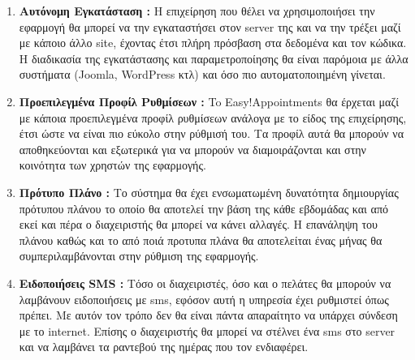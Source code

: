 \documentclass[12pt]{article}
\begin{document}
\begin{enumerate}
\item {\bf Αυτόνομη Εγκατάσταση :} Η επιχείρηση που θέλει να χρησιμοποιήσει την εφαρμογή θα μπορεί να την εγκαταστήσει στον server της και να την τρέξει μαζί με κάποιο άλλο site, έχοντας έτσι πλήρη πρόσβαση στα δεδομένα και τον κώδικα. Η διαδικασία της εγκατάστασης και παραμετροποίησης θα είναι παρόμοια με άλλα συστήματα (Joomla, WordPress κτλ) και όσο πιο αυτοματοποιημένη γίνεται.

\item {\bf Προεπιλεγμένα Προφίλ Ρυθμίσεων :} To Easy!Appointments θα έρχεται μαζί με κάποια προεπιλεγμένα προφίλ ρυθμίσεων ανάλογα με το είδος της επιχείρησης, έτσι ώστε να είναι πιο εύκολο στην ρύθμισή του. Τα προφίλ αυτά θα μπορούν να αποθηκεύονται και εξωτερικά για να μπορούν να διαμοιράζονται και στην κοινότητα των χρηστών της εφαρμογής.

\item {\bf Πρότυπο Πλάνο :} Το σύστημα θα έχει ενσωματωμένη δυνατότητα δημιουργίας πρότυπου πλάνου το οποίο θα αποτελεί την βάση της κάθε εβδομάδας και από εκεί και πέρα ο διαχειριστής θα μπορεί να κάνει αλλαγές. Η επανάληψη του πλάνου καθώς και το από ποιά προτυπα πλάνα θα αποτελείται ένας μήνας θα συμπεριλαμβάνονται στην ρύθμιση της εφαρμογής.

\item {\bf Ειδοποιήσεις SMS :} Τόσο οι διαχειριστές, όσο και ο πελάτες θα μπορούν να λαμβάνουν  ειδοποιήσεις με sms, εφόσον αυτή η υπηρεσία έχει ρυθμιστεί όπως πρέπει. Με αυτόν τον τρόπο δεν θα είναι πάντα απαραίτητο να υπάρχει σύνδεση με το internet. Επίσης ο διαχειριστής θα μπορεί να στέλνει ένα sms στο server και να λαμβάνει τα ραντεβού της ημέρας που τον ενδιαφέρει.

\end{enumerate}
\end{document}
